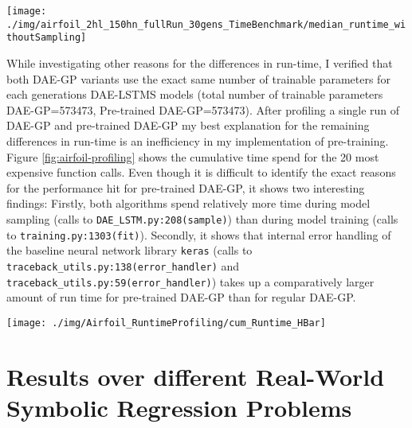 \documentclass[
  11pt,
]{article}
\let\origfigure\figure
\let\endorigfigure\endfigure
\renewenvironment{figure}[1][2] {
    \expandafter\origfigure\expandafter[H]
} {
    \endorigfigure
}
\begin{document}
\begin{figure}[c]

{\centering \texttt{[image: ./img/airfoil\_2hl\_150hn\_fullRun\_30gens\_TimeBenchmark/median\_runtime\_withoutSampling]} 

}

\caption{Median Runtime excluding Time for Sampling - Airfoil}\label{fig:airfoil-runtime-noSampling-total}
\end{figure}

While investigating other reasons for the differences in run-time, I verified that both DAE-GP variants use the exact same number of trainable parameters for each generations DAE-LSTMS models (total number of trainable parameters DAE-GP=573473, Pre-trained DAE-GP=573473). After profiling a single run of DAE-GP and pre-trained DAE-GP my best explanation for the remaining differences in run-time is an inefficiency in my implementation of pre-training. Figure \ref{fig:airfoil-profiling} shows the cumulative time spend for the 20 most expensive function calls. Even though it is difficult to identify the exact reasons for the performance hit for pre-trained DAE-GP, it shows two interesting findings: Firstly, both algorithms spend relatively more time during model sampling (calls to \texttt{DAE\_LSTM.py:208(sample)}) than during model training (calls to \texttt{training.py:1303(fit)}). Secondly, it shows that internal error handling of the baseline neural network library \texttt{keras} (calls to \texttt{traceback\_utils.py:138(error\_handler)} and \texttt{traceback\_utils.py:59(error\_handler)}) takes up a comparatively larger amount of run time for pre-trained DAE-GP than for regular DAE-GP.

\begin{figure}[c]

{\centering \texttt{[image: ./img/Airfoil\_RuntimeProfiling/cum\_Runtime\_HBar]} 

}

\caption{Cumulative Time consumption by Function Calls (Top 20) - Airfoil}\label{fig:airfoil-profiling}
\end{figure}

\hypertarget{results-over-different-real-world-symbolic-regression-problems}{%
\section{Results over different Real-World Symbolic Regression Problems}\label{results-over-different-real-world-symbolic-regression-problems}}
\end{document}
